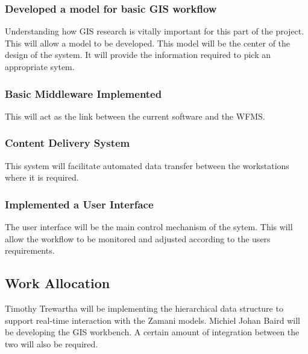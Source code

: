 \documentclass[12pt,a4paper]{article}
\begin{document}
\subsubsection*{Developed a model for basic GIS workflow}
Understanding how GIS research is vitally important for this part of
the project. This will allow a model to be developed. This model will
be the center of the design of the system. It will provide the
information required to pick an appropriate sytem.
\subsubsection*{Basic Middleware Implemented}
This will act as the link between the current software and the WFMS.
\subsubsection*{Content Delivery System}
This system will facilitate automated data transfer between the workstations
where it is required.
\subsubsection*{Implemented a User Interface}
The user interface will be the main control mechanism of the sytem. This
will allow the workflow to be monitored and adjusted according to the users
requirements.

\subsection{Work Allocation}
Timothy Trewartha will be implementing the hierarchical data structure to support
real-time interaction with the Zamani models. Michiel Johan Baird will be developing
the GIS workbench. A certain amount of integration between the two will also be required.






\end{document}
